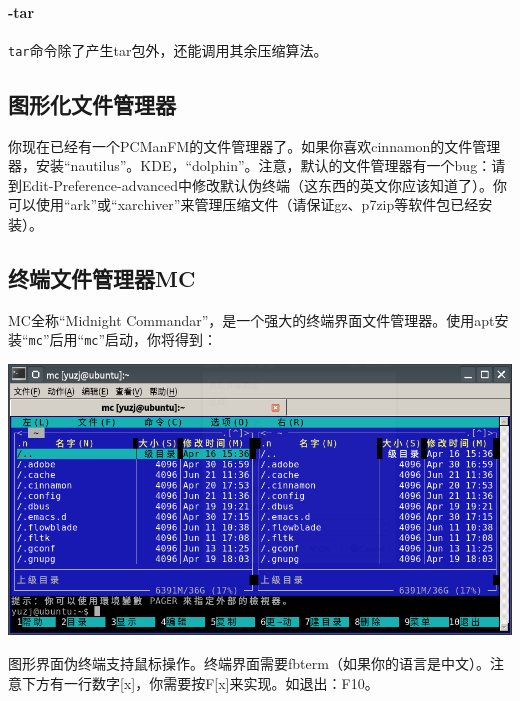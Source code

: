 \paragraph{-tar}
\verb|tar|命令除了产生tar包外，还能调用其余压缩算法。
\subsection{图形化文件管理器}
你现在已经有一个PCManFM的文件管理器了。如果你喜欢cinnamon的文件管理器，安装“nautilus”。KDE，“dolphin”。注意，默认的文件管理器有一个bug：请到Edit-Preference-advanced中修改默认伪终端（这东西的英文你应该知道了）。你可以使用“ark”或“xarchiver”来管理压缩文件（请保证gz、p7zip等软件包已经安装）。
\subsection{终端文件管理器MC}
MC全称“Midnight Commandar”，是一个强大的终端界面文件管理器。使用apt安装“\verb|mc|”后用“\verb|mc|”启动，你将得到：
\begin{center}
	\includegraphics[scale=0.7]{pic/mc}
\end{center} \par
图形界面伪终端支持鼠标操作。终端界面需要fbterm（如果你的语言是中文）。注意下方有一行数字[x]，你需要按F[x]来实现。如退出：F10。
